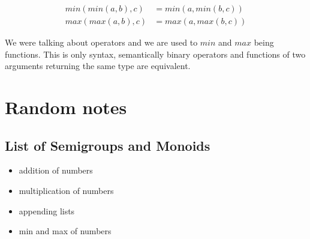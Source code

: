 \documentclass{article}
\begin{document}
    \begin{align*}
        min(min(a, b), c) &= min(a, min(b, c)) \\
        max(max(a, b), c) &= max(a, max(b, c))
    \end{align*}

    We were talking about operators and we are used to $min$ and $max$ being functions. 
    This is only syntax, semantically binary operators and functions of two arguments returning the same type are equivalent.


\newpage
\section{Random notes}
\subsection{List of Semigroups and Monoids}

\begin{itemize}
    \item addition of numbers
    \item multiplication of numbers
    \item appending lists
    \item min and max of numbers
\end{itemize}
\end{document}
